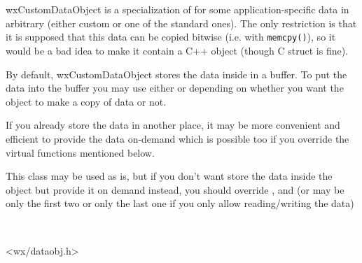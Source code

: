 \section{}\label{wxcustomdataobject}

wxCustomDataObject is a specialization of 
 for some
application-specific data in arbitrary (either custom or one of the standard
ones). The only restriction is that it is supposed that this data can be
copied bitwise (i.e. with {\tt memcpy()}), so it would be a bad idea to make
it contain a C++ object (though C struct is fine).

By default, wxCustomDataObject stores the data inside in a buffer. To put the
data into the buffer you may use either 
 or 
 depending on whether you want
the object to make a copy of data or not.

If you already store the data in another place, it may be more convenient and
efficient to provide the data on-demand which is possible too if you override
the virtual functions mentioned below.


This class may be used as is, but if you don't want store the data inside the
object but provide it on demand instead, you should override 
, 
 and 
 (or may be only the first two or
only the last one if you only allow reading/writing the data)


\\


<wx/dataobj.h>




\label{wxcustomdataobjectwxcustomdataobject}


